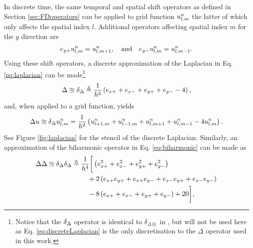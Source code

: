 In discrete time, the same temporal and spatial shift operators as defined in Section \ref{sec:FDoperators} can be applied to grid function $u_{l,m}^n$ the latter of which only affects the spatial index $l$. Additional operators affecting spatial index $m$ for the $y$ direction are
\begin{equation}
    e_{y+}u_{l,m}^n = u_{l, m+1}^n,\quad \text{and}\quad e_{y-}u_{l,m}^n= u_{l, m-1}^n.
\end{equation}
Using these shift operators, a discrete approximation of the Laplacian in Eq. \eqref{eq:laplacian} can be made\footnote{Notice that the $\delta_{\Delta}$ operator is identical to $\delta_{\Delta \boxplus}$ in \cite{theBible}, but will not be used here as Eq. \eqref{eq:discreteLaplacian} is the only discretisation to the $\Delta$ operator used in this work.} 
\begin{equation}\label{eq:discreteLaplacian}
    \Delta \approxeq \delta_{\Delta} \triangleq \frac{1}{h^2}\left(e_{x+} + e_{x-} + e_{y+} + e_{y-} - 4\right),
\end{equation}
and, when applied to a grid function, yields
\begin{equation}\label{eq:laplacianExpansion}
    \Delta u \approxeq \delta_{\Delta} u_{l,m}^n = \frac{1}{h^2}\left(u_{l+1, m}^n + u_{l-1, m}^n+u_{l, m+1}^n+u_{l, m-1}^n - 4 u_{l,m}^n\right). 
\end{equation}
See Figure \ref{fig:laplacian} for the stencil of the discrete Laplacian. Similarly, an approximation of the biharmonic operator in Eq. \eqref{eq:biharmonic} can be made as
\begin{equation}\label{eq:discreteBiharmonic}
        \Delta\Delta \approxeq \delta_{\Delta}\delta_{\Delta} 
        \triangleq \begin{aligned}[t]
        &\frac{1}{h^4}\bigg[\left(e_{x+}^2 + e_{x-}^2 + e_{y+}^2 + e_{y-}^2\right) \\
        &\ \ \ + 2 \left(e_{x+}e_{y+} + e_{x+}e_{y-} + e_{x-}e_{y+} + e_{x-}e_{y-}\right) \\
        &\ \ \ -8 \left(e_{x+} + e_{x-} + e_{y+} + e_{y-}\right) + 20\bigg],
    \end{aligned}
\end{equation}
